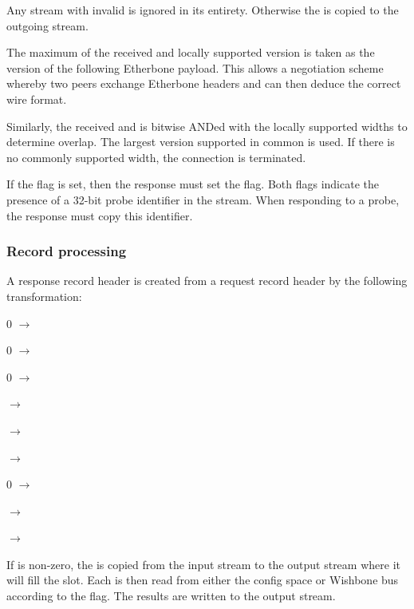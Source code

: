\documentclass{article}
\newenvironment{packed_itemize}{
\begin{itemize}
  \setlength{\itemsep}{1pt}
  \setlength{\parskip}{0pt}
  \setlength{\parsep}{0pt}
}{\end{itemize}}
\begin{document}

Any stream with invalid  is ignored in its entirety.
Otherwise the  is copied to the outgoing stream.

The maximum of the received  and 
locally supported version is taken
as the version of the following Etherbone payload.
This allows a negotiation scheme whereby two peers
exchange Etherbone headers and can then deduce the correct wire format.

Similarly, 
the received  and 
is bitwise ANDed with the locally supported widths to determine overlap.
The largest version supported in common is used.
If there is no commonly supported width, 
the connection is terminated.

If the  flag is set,
then the response must set the  flag.
Both flags indicate the presence of a 32-bit probe identifier in the stream.
When responding to a probe, 
the response must copy this identifier.

\subsubsection{Record processing}

A response record header is created from a request record header by the
following transformation:
\begin{packed_itemize}
\item 0 $\to$ 
\item 0 $\to$ 
\item 0 $\to$ 
\item {} $\to$ 
\item {} $\to$ 
\item {} $\to$ 
\item 0 $\to$ 
\item {} $\to$ 
\item {} $\to$ 
\end{packed_itemize}

If  is non-zero,
the  is copied from the input stream to the
output stream where it will fill the  slot.
Each  is then read from either the config space or
Wishbone bus according to the  flag.
The results are written to the output stream.
\end{document}
